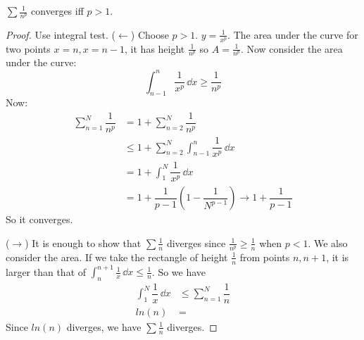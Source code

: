\documentclass{report}
\begin{document}
\begin{theorem}{15.1}
    $\sum \frac{1}{n^{p}}$  converges iff $p > 1$.
\end{theorem}
    \begin{proof}
        Use integral test. ($\leftarrow $) Choose $p > 1$. $y = \frac{1}{x^{p}}$. The area under the curve 
        for two points $x = n, x = n - 1$, it has height $\frac{1}{n^{p}}$ so $A = \frac{1}{n^{p}}$. Now consider the area under the curve:
            \begin{equation*}
                \int_{n - 1}^{n} \dfrac{1}{x^{p}} \, \dd{x} \geq \dfrac{1}{n^{p}}
            \end{equation*}
        Now:
            \begin{align*}
                \sum_{n = 1}^{N} \dfrac{1}{n^{p}} &= 1 + \sum_{n = 2}^{N} \dfrac{1}{n^{p}} \\ 
                                                  &\leq 1 + \sum_{n = 2}^{N} \int_{n - 1}^{n} \dfrac{1}{x^{p}} \, \dd{x} \\
                                                  &= 1 + \int_{1}^{N} \dfrac{1}{x^{p}} \, \dd{x}  \\
                                                  &= 1 + \dfrac{1}{p -1}\left(1 - \dfrac{1}{N^{p - 1}}\right) \rightarrow 1 + \dfrac{1}{p - 1}
            \end{align*}
        So it converges.

        ($\rightarrow $) It is enough to show that $\sum \frac{1}{n}$ diverges since $\frac{1}{n^{p}} \geq \frac{1}{n}$ when $p < 1$. We also consider the area. If we take the rectangle of height $\frac{1}{n}$ from points $n, n + 1$, it is larger than that of $\int_{n}^{n + 1} \frac{1}{x} \, \dd{x} \leq \frac{1}{n}$. So we have
            \begin{align*}
                \int_{1}^{N} \dfrac{1}{x} \, \dd{x}  &\leq  \sum_{n = 1}^{N} \dfrac{1}{n} \\
                ln(n)                                &=                                     
            \end{align*}
        Since $ln(n)$ diverges, we have $\sum \frac{1}{n}$ diverges.
    \end{proof}
\end{document}

